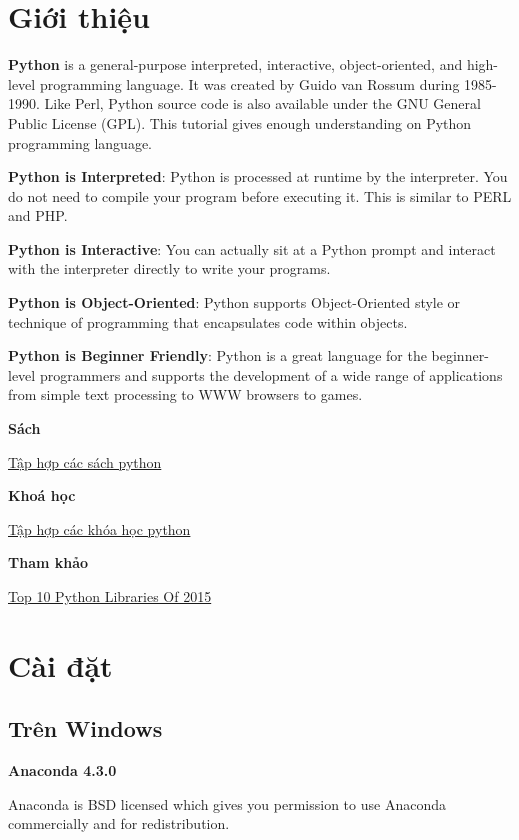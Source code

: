 \section{Giới thiệu}

\textbf{Python} is a general-purpose interpreted, interactive, object-oriented, and high-level programming language. It was created by Guido van Rossum during 1985- 1990. Like Perl, Python source code is also available under the GNU General Public License (GPL). This tutorial gives enough understanding on Python programming language.

\textbf{Python is Interpreted}: Python is processed at runtime by the interpreter. You do not need to compile your program before executing it. This is similar to PERL and PHP.

\textbf{Python is Interactive}: You can actually sit at a Python prompt and interact with the interpreter directly to write your programs.

\textbf{Python is Object-Oriented}: Python supports Object-Oriented style or technique of programming that encapsulates code within objects.

\textbf{Python is Beginner Friendly}: Python is a great language for the beginner-level programmers and supports the development of a wide range of applications from simple text processing to WWW browsers to games.

\textbf{Sách}

\href{https://docs.google.com/document/d/1gQFMXZtynpuTenoOQNGCHttArT4NspTWcyJQr5ps9Mk/edit?usp=sharing}{Tập hợp các sách python}

\textbf{Khoá học}

\href{1frO9QYhgsXbMzcyXoA4czWkxTWF8RBTJVf9uoO1rElU}{Tập hợp các khóa học python}

\textbf{Tham khảo}

\href{http://blog.tryolabs.com/2015/12/15/top-10-python-libraries-of-2015/}{Top 10 Python Libraries Of 2015}

\section{Cài đặt}

\subsection{Trên Windows}

\textbf{Anaconda 4.3.0}

Anaconda is BSD licensed which gives you permission to use Anaconda commercially and for redistribution.

